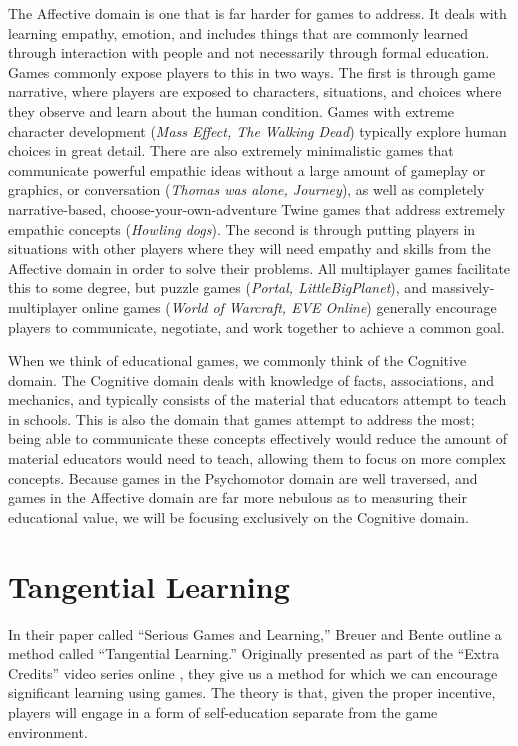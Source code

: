\documentclass[12pt]{report}
\begin{document}
		The Affective domain is one that is far harder for games to address. It deals with learning empathy, emotion, and includes things that are commonly learned through interaction with people and not necessarily through formal education. Games commonly expose players to this in two ways. The first is through game narrative, where players are exposed to characters, situations, and choices where they observe and learn about the human condition. Games with extreme character development (\textit{Mass Effect, The Walking Dead}) typically explore human choices in great detail. There are also extremely minimalistic games that communicate powerful empathic ideas without a large amount of gameplay or graphics, or conversation (\textit{Thomas was alone, Journey}), as well as completely narrative-based, choose-your-own-adventure Twine games that address extremely empathic concepts (\textit{Howling dogs}). The second is through putting players in situations with other players where they will need empathy and skills from the Affective domain in order to solve their problems. All multiplayer games facilitate this to some degree, but puzzle games (\textit{Portal, LittleBigPlanet}), and massively-multiplayer online games (\textit{World of Warcraft, EVE Online}) generally encourage players to communicate, negotiate, and work together to achieve a common goal.

		When we think of educational games, we commonly think of the Cognitive domain. The Cognitive domain deals with knowledge of facts, associations, and mechanics, and typically consists of the material that educators attempt to teach in schools. This is also the domain that games attempt to address the most; being able to communicate these concepts effectively would reduce the amount of material educators would need to teach, allowing them to focus on more complex concepts. Because games in the Psychomotor domain are well traversed, and games in the Affective domain are far more nebulous as to measuring their educational value, we will be focusing exclusively on the Cognitive domain.

			

	\section{Tangential Learning}

		In their paper called “Serious Games and Learning,” Breuer and Bente \cite{serious} outline a method called “Tangential Learning.” Originally presented as part of the “Extra Credits” video series online \cite{extracredits}, they give us a method for which we can encourage significant learning using games. The theory is that, given the proper incentive, players will engage in a form of self-education separate from the game environment.
		
\end{document}
